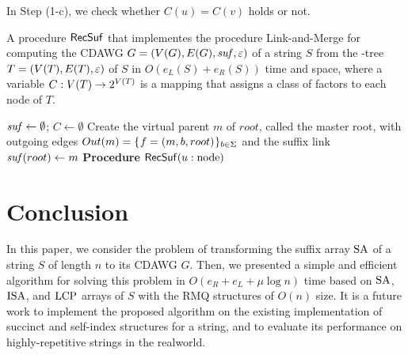 In Step (1-c), we check whether $C(u) = C(v)$ holds or not. 



\begin{algorithm}[t]
  \caption{A procedure $\mathsf{RecSuf}$ that implementes the procedure Link-and-Merge for computing the CDAWG $G = (V(G), E(G), \mathit{suf}, \varepsilon)$ of a string $S$  from the \LPTrm-tree $T = (V(T), E(T), \varepsilon)$ of $S$ in $O(e_L(S) + e_R(S))$ time and space, where a variable $C: V(T)\to 2^{V(T)}$ is a mapping that assigns a class of factors to each node of $T$. 
  }\label{algo:rec:cdawg}
  $\mathit{suf} \gets \emptyset$; 
  $C \gets \emptyset$\;
  Create the virtual parent $m$ of $root$, called the master root,  with outgoing edges $Out(m) = \{\kern0.05em f = (m, b, root) \kern0.05em\}_{b \in \Sigma}$ and the suffix link $\mathit{suf}(root) \gets m$\;
  \medskip
  \textbf{Procedure} $\mathsf{RecSuf}(u: \mathrm{node})$\; 
\end{algorithm}


\section{Conclusion}
\label{sec:concl}
In this paper, we consider the problem of transforming the suffix array $\mathrm{SA}$ of a string $S$ of length $n$ to its CDAWG $G$. Then, we  presented a simple and efficient algorithm for solving this problem in $O(e_R + e_L + \mu\log n)$ time  based on $\mathrm{SA}$, $\mathrm{ISA}$, and $\mathrm{LCP}$ arrays of $S$ with the RMQ structures of $O(n)$ size.
It is a future work to implement the proposed algorithm on the existing implementation of succinct and self-index structures for a string, and to evaluate its performance on highly-repetitive strings in the realworld. 


